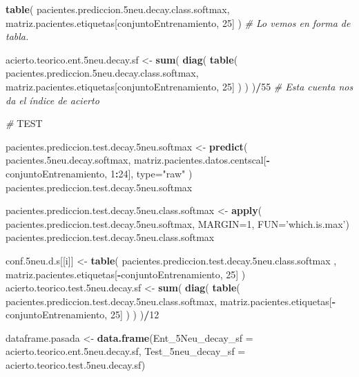 \documentclass[]{article}
\newenvironment{Shaded}{\begin{snugshade}}{\end{snugshade}}
\newcommand{\AlertTok}[1]{\textcolor[rgb]{0.94,0.16,0.16}{#1}}
\newcommand{\CommentTok}[1]{\textcolor[rgb]{0.56,0.35,0.01}{\textit{#1}}}
\newcommand{\DataTypeTok}[1]{\textcolor[rgb]{0.13,0.29,0.53}{#1}}
\newcommand{\DecValTok}[1]{\textcolor[rgb]{0.00,0.00,0.81}{#1}}
\newcommand{\FloatTok}[1]{\textcolor[rgb]{0.00,0.00,0.81}{#1}}
\newcommand{\KeywordTok}[1]{\textcolor[rgb]{0.13,0.29,0.53}{\textbf{#1}}}
\newcommand{\NormalTok}[1]{#1}
\newcommand{\OperatorTok}[1]{\textcolor[rgb]{0.81,0.36,0.00}{\textbf{#1}}}
\newcommand{\StringTok}[1]{\textcolor[rgb]{0.31,0.60,0.02}{#1}}
\begin{document}
\begin{Shaded}
\begin{Highlighting}[]
  \KeywordTok{table}\NormalTok{( pacientes.prediccion}\FloatTok{.5}\NormalTok{neu.decay.class.softmax, matriz.pacientes.etiquetas[conjuntoEntrenamiento, }\DecValTok{25}\NormalTok{] )  }\CommentTok{# Lo vemos en forma de tabla.}
  
\NormalTok{  acierto.teorico.ent}\FloatTok{.5}\NormalTok{neu.decay.sf <-}\StringTok{ }\KeywordTok{sum}\NormalTok{( }\KeywordTok{diag}\NormalTok{( }\KeywordTok{table}\NormalTok{( pacientes.prediccion}\FloatTok{.5}\NormalTok{neu.decay.class.softmax, matriz.pacientes.etiquetas[conjuntoEntrenamiento, }\DecValTok{25}\NormalTok{] ) ) )}\OperatorTok{/}\DecValTok{55} \CommentTok{# Esta cuenta nos da el índice de acierto}
  
  \CommentTok{# }\AlertTok{TEST}
  
\NormalTok{  pacientes.prediccion.test.decay}\FloatTok{.5}\NormalTok{neu.softmax <-}\StringTok{ }\KeywordTok{predict}\NormalTok{( pacientes}\FloatTok{.5}\NormalTok{neu.decay.softmax, matriz.pacientes.datos.centscal[}\OperatorTok{-}\NormalTok{conjuntoEntrenamiento, }\DecValTok{1}\OperatorTok{:}\DecValTok{24}\NormalTok{], }\DataTypeTok{type=}\StringTok{"raw"}\NormalTok{ )}
\NormalTok{  pacientes.prediccion.test.decay}\FloatTok{.5}\NormalTok{neu.softmax}
  
\NormalTok{  pacientes.prediccion.test.decay}\FloatTok{.5}\NormalTok{neu.class.softmax <-}\StringTok{ }\KeywordTok{apply}\NormalTok{( pacientes.prediccion.test.decay}\FloatTok{.5}\NormalTok{neu.softmax, }\DataTypeTok{MARGIN=}\DecValTok{1}\NormalTok{, }\DataTypeTok{FUN=}\StringTok{'which.is.max'}\NormalTok{)}
\NormalTok{  pacientes.prediccion.test.decay}\FloatTok{.5}\NormalTok{neu.class.softmax}
  
\NormalTok{  conf}\FloatTok{.5}\NormalTok{neu.d.s[[i]] <-}\StringTok{ }\KeywordTok{table}\NormalTok{( pacientes.prediccion.test.decay}\FloatTok{.5}\NormalTok{neu.class.softmax , matriz.pacientes.etiquetas[}\OperatorTok{-}\NormalTok{conjuntoEntrenamiento, }\DecValTok{25}\NormalTok{] )}
\NormalTok{  acierto.teorico.test}\FloatTok{.5}\NormalTok{neu.decay.sf <-}\StringTok{ }\KeywordTok{sum}\NormalTok{( }\KeywordTok{diag}\NormalTok{( }\KeywordTok{table}\NormalTok{( pacientes.prediccion.test.decay}\FloatTok{.5}\NormalTok{neu.class.softmax, matriz.pacientes.etiquetas[}\OperatorTok{-}\NormalTok{conjuntoEntrenamiento, }\DecValTok{25}\NormalTok{] ) ) )}\OperatorTok{/}\DecValTok{12}
  
  
\NormalTok{  dataframe.pasada <-}\StringTok{ }\KeywordTok{data.frame}\NormalTok{(}\DataTypeTok{Ent_5Neu_decay_sf =}\NormalTok{ acierto.teorico.ent}\FloatTok{.5}\NormalTok{neu.decay.sf,}
                                 \DataTypeTok{Test_5neu_decay_sf =}\NormalTok{ acierto.teorico.test}\FloatTok{.5}\NormalTok{neu.decay.sf)}
  

\end{Highlighting}
\end{Shaded}
\end{document}
